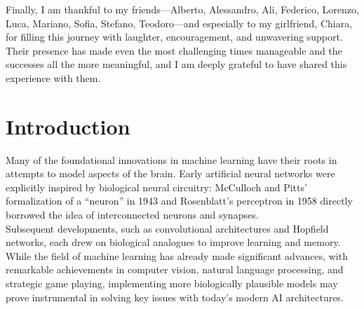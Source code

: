 \documentclass[a4paper,12pt]{report}
\begin{document}
Finally, I am thankful to my friends—Alberto, Alessandro, Ali, Federico, Lorenzo, Luca, 
Mariano, Sofia, Stefano, Teodoro—and especially to my girlfriend, Chiara, for filling 
this journey with laughter, encouragement, and unwavering support. Their presence 
has made even the most challenging times manageable and the successes all the more 
meaningful, and I am deeply grateful to have shared this experience with them.\\


\noindent 
\newpage
\thispagestyle{empty}\mbox{}\newpage

\setcounter{page}{1}

\tableofcontents
\newpage


\chapter*{Introduction}

Many of the foundational innovations in machine learning have their roots in attempts to model aspects 
of the brain. Early artificial neural networks were explicitly inspired by biological neural 
circuitry: McCulloch and Pitts' formalization of a ``neuron'' in 1943 and Rosenblatt's perceptron in 
1958 directly borrowed the idea of interconnected neurons and synapses. \\
Subsequent developments, such as convolutional architectures and Hopfield networks, each drew on 
biological analogues to improve learning and memory. While the field of machine learning has already 
made significant advances, with remarkable achievements in computer vision, natural language 
processing, and strategic game playing, implementing more biologically plausible models may prove 
instrumental in solving key issues with today's modern AI architectures.
\vspace{0.5em}
\end{document}
